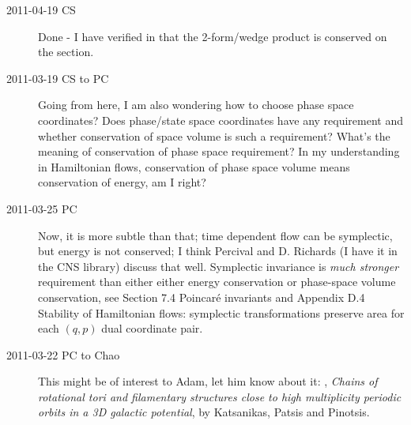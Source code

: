 \begin{description}
\item[2011-04-19 CS] Done - I have verified in  that
the 2-form/wedge product is conserved on the \Poincare section.


\item[2011-03-19 CS to PC]
Going from here, I am also
   wondering how to choose phase space coordinates? Does phase/state
   space coordinates have any requirement and whether conservation of
   space volume is such a requirement? What's the meaning of conservation
   of phase space requirement? In my understanding in Hamiltonian flows,
   conservation of phase space volume means conservation of energy, am I
   right?


\item[2011-03-25 PC]
Now, it is more subtle than that; time dependent flow can be symplectic, but energy is not conserved; I think Percival and D. Richards (I have it in the
 {CNS library}) discuss that well. Symplectic invariance is \emph{much stronger} requirement than either either energy conservation or phase-space volume conservation, see
 {Section 7.4 Poincar\'e invariants} and 
{Appendix D.4 Stability of Hamiltonian flows}:
symplectic transformations preserve area for each $(q,p)$ dual coordinate  pair.

\item[2011-03-22 PC to Chao]
This might be of interest to Adam, let him know about it:
,
\emph{Chains of rotational tori and filamentary structures close to high
 multiplicity periodic orbits in a 3D galactic potential},
 by Katsanikas, Patsis and Pinotsis.


\end{description}
